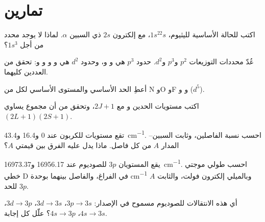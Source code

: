 \section{تمارين}

\begin{exercise}[$\star$]\label{exo:b3:many-electron-atoms:1}
اكتب  للحالة الأساسية لليثيوم، $1s^22s$، مع
إلكترون $2s$ ذي السبين $\alpha$. لماذا لا يوجد محدد من أجل
$1s^3$؟
\end{exercise}

\begin{exercise}[$\star$]\label{exo:b3:many-electron-atoms:2}
عُدّ محددات التوزيعات $p^2$ و$p^3$ و$d^2$. حدود
$p^3$ هي  و و، وحدود $d^2$ هي  و و
و و: تحقق من العددين كليهما.
\end{exercise}

\begin{exercise}[$\star$]\label{exo:b3:many-electron-atoms:3}
أعطِ الحد الأساسي والمستوى الأساسي لكل من N وO وF و و ($d^5$).
\end{exercise}

\begin{exercise}[$\star$]\label{exo:b3:many-electron-atoms:4}
اكتب مستويات الحدين  و مع  $2J+1$،
وتحقق من أن مجموع  يساوي $(2L+1)(2S+1)$.
\end{exercise}

\begin{exercise}[$\star\star$]\label{exo:b3:many-electron-atoms:5}
تقع مستويات  للكربون عند 0 و16.4 و\qty{43.4}{cm^{-1}}. احسب
نسبة الفاصلين، وثابت السبين--المدار $A$ من كل فاصل.
ماذا يدل عليه الفرق بين قيمتي $A$؟
\end{exercise}

\begin{exercise}[$\star\star$]\label{exo:b3:many-electron-atoms:6}
يقع المستويان $3p$ للصوديوم عند 16956.17 و\qty{16973.37}{cm^{-1}}. احسب
طولي موجتي خطي D في الفراغ، والفاصل بينهما بوحدة \unit{cm^{-1}} 
وبالميلي إلكترون فولت، والثابت $A$ للحد $3p$.
\end{exercise}

\begin{exercise}[$\star\star$]\label{exo:b3:many-electron-atoms:7}
أي هذه الانتقالات للصوديوم مسموح في الإصدار: $3p \to 3s$،
$3d \to 3s$، $3d \to 3p$، $4s \to 3s$، $4s \to 3p$؟ علّل كل إجابة.
\end{exercise}

